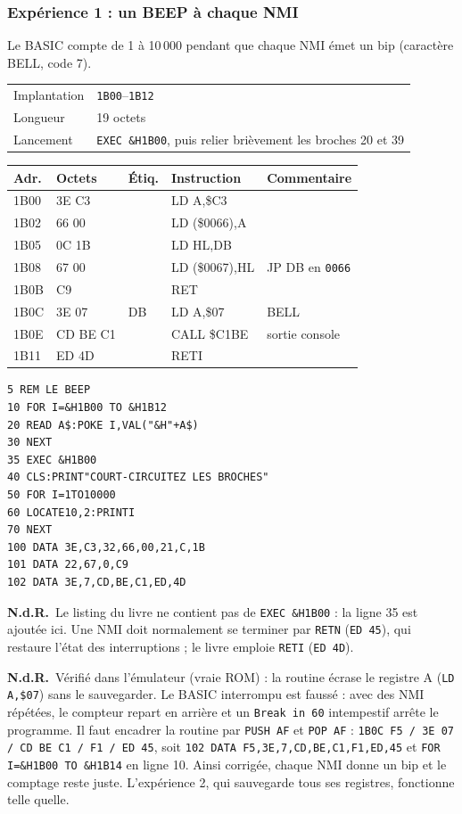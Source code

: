\documentclass[a4paper,10pt]{article}
\makeatletter
\newcommand{\hex}[1]{\texttt{#1}}
\newcommand{\nota}[1]{\textcolor{red!60!black}{\small\textbf{N.d.R.}~#1}}
\newcommand{\fiche}[3]{%
  \begin{center}\small
  \begin{tabular}{@{}ll@{}}
  \toprule
  Implantation & #1 \\
  Longueur & #2 \\
  Lancement & #3 \\
  \bottomrule
  \end{tabular}
  \end{center}}
\newenvironment{asm}
  {\small\begin{longtable}{@{}>{\ttfamily}l>{\ttfamily}l>{\ttfamily}l>{\ttfamily}l>{\raggedright\arraybackslash}p{6.2cm}@{}}
   \toprule
   \normalfont\bfseries Adr. & \normalfont\bfseries Octets & \normalfont\bfseries Étiq. & \normalfont\bfseries Instruction & \textbf{Commentaire}\\
   \midrule\endhead
   \bottomrule\endfoot}
  {\end{longtable}}
\makeatother
\begin{document}
\subsubsection*{Expérience 1 : un BEEP à chaque NMI}
Le BASIC compte de 1 à 10\,000 pendant que chaque NMI émet un bip
(caractère BELL, code 7).
\fiche{\hex{1B00}--\hex{1B12}}{19 octets}{\texttt{EXEC \&H1B00}, puis relier brièvement les broches 20 et 39}
\begin{asm}
1B00 & 3E C3    & & LD A,\$C3      & \\
1B02 & 32 66 00 & & LD (\$0066),A  & \\
1B05 & 21 0C 1B & & LD HL,DB       & \\
1B08 & 22 67 00 & & LD (\$0067),HL & JP DB en \hex{0066} \\
1B0B & C9       & & RET            & \\
1B0C & 3E 07    & DB & LD A,\$07   & BELL \\
1B0E & CD BE C1 & & CALL \$C1BE    & sortie console \\
1B11 & ED 4D    & & RETI           & \\
\end{asm}
\begin{verbatim}
5 REM LE BEEP
10 FOR I=&H1B00 TO &H1B12
20 READ A$:POKE I,VAL("&H"+A$)
30 NEXT
35 EXEC &H1B00
40 CLS:PRINT"COURT-CIRCUITEZ LES BROCHES"
50 FOR I=1TO10000
60 LOCATE10,2:PRINTI
70 NEXT
100 DATA 3E,C3,32,66,00,21,C,1B
101 DATA 22,67,0,C9
102 DATA 3E,7,CD,BE,C1,ED,4D
\end{verbatim}
\nota{Le listing du livre ne contient pas de \texttt{EXEC \&H1B00} : la ligne
35 est ajoutée ici. Une NMI doit normalement se terminer par \texttt{RETN}
(\hex{ED 45}), qui restaure l'état des interruptions ; le livre emploie
\texttt{RETI} (\hex{ED 4D}).}

\nota{Vérifié dans l'émulateur (vraie ROM) : la routine écrase le registre A
(\texttt{LD A,\$07}) sans le sauvegarder. Le BASIC interrompu est faussé :
avec des NMI répétées, le compteur repart en arrière et un \texttt{Break in
60} intempestif arrête le programme. Il faut encadrer la routine par
\texttt{PUSH AF} et \texttt{POP AF} :
\texttt{1B0C F5 / 3E 07 / CD BE C1 / F1 / ED 45}, soit
\texttt{102 DATA F5,3E,7,CD,BE,C1,F1,ED,45} et \texttt{FOR I=\&H1B00 TO
\&H1B14} en ligne 10. Ainsi corrigée, chaque NMI donne un bip et le comptage
reste juste. L'expérience 2, qui sauvegarde tous ses registres, fonctionne
telle quelle.}
\end{document}
